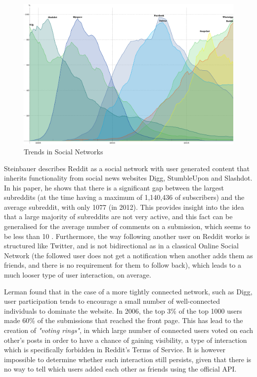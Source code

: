 \documentclass[bsc,frontabs,twoside,singlespacing,parskip,deptreport]{infthesis}
\begin{document}
\begin{figure}[hbt]
	\centering
    \includegraphics[width=\textwidth]{images/social_networks_over_time}
    \caption{Trends in Social Networks \cite{fig:social_networks}}
    \label{trends}
\end{figure}

Steinbauer \cite{steinbauer} describes Reddit as a social network with user generated content that inherits functionality from social news websites Digg, StumbleUpon and Slashdot. In his paper, he shows that there is a significant gap between the largest subreddits (at the time having a maximum of 1,140,436 of subscribers) and the average subreddit, with only 1077 (in 2012). This provides insight into the idea that a large majority of subreddits are not very active, and this fact can be generalised for the average number of comments on a submission, which seems to be less than 10 \cite{steinbauer}. Furthermore, the way following another user on Reddit works is structured like Twitter, and is not bidirectional as in a classical Online Social Network (the followed user does not get a notification when another adds them as friends, and there is no requirement for them to follow back), which leads to a much looser type of user interaction, on average. 

Lerman \cite{LermanK.2007UPiS} found that in the case of a more tightly connected network, such as Digg, user participation tends to encourage a small number of well-connected individuals to dominate the website. In 2006, the top 3\% of the top 1000 users made 60\% of the submissions that reached the front page. This has lead to the creation of \textit{"voting rings"}, in which large number of connected users voted on each other's posts in order to have a chance of gaining visibility, a type of interaction which is specifically forbidden in Reddit's Terms of Service. It is however impossible to determine whether such interaction still persists, given that there is no way to tell which users added each other as friends using the official API.
\end{document}
